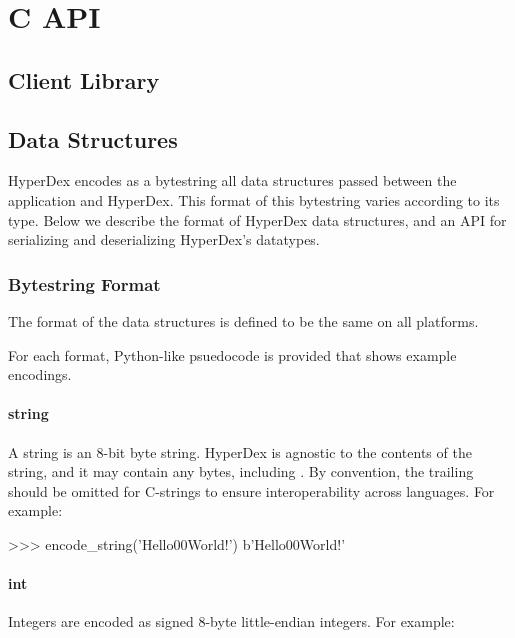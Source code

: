 \chapter{C API}

\section{Client Library}


\section{Data Structures}

HyperDex encodes as a bytestring all data structures passed between the
application and HyperDex.  This format of this bytestring varies according to
its type.  Below we describe the format of HyperDex data structures, and an API
for serializing and deserializing HyperDex's datatypes.

\subsection{Bytestring Format}

The format of the data structures is defined to be the same on all platforms.

For each format, Python-like psuedocode is provided that shows example
encodings.

\subsubsection{string}

A string is an 8-bit byte string.  HyperDex is agnostic to the contents of the
string, and it may contain any bytes, including .  By convention,
the trailing  should be omitted for C-strings to ensure
interoperability across languages.  For example:

\begin{pythoncode}
>>> encode_string('Hello\x00World!')
b'Hello\x00World!'
\end{pythoncode}

\subsubsection{int}

Integers are encoded as signed 8-byte little-endian integers.  For example:

